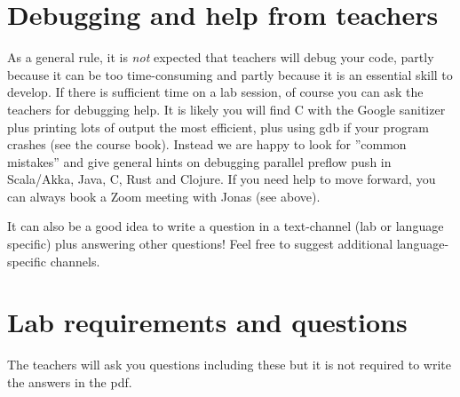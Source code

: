 \documentclass{forsete}
\begin{document}
\section{Debugging and help from teachers}
As a general rule, it is {\em not} expected that teachers will debug your code, partly because it can be 
too time-consuming and partly because it is an essential skill to develop. If there is sufficient time on a lab session, of course you can ask the teachers for debugging help. It is likely you will find C with the
Google sanitizer plus printing lots of output the most efficient, plus using gdb if your program crashes (see the
course book).
Instead we are happy to look for ''common mistakes'' and give general hints on debugging parallel preflow push in 
Scala/Akka, Java, C, Rust and Clojure. If you need help to move forward, you can always book a Zoom meeting with Jonas (see above).

It can also be a good idea to write a question in a text-channel (lab or language specific) plus answering 
other questions! Feel free to suggest additional language-specific channels.

\section{Lab requirements and questions}
The teachers will ask you questions including these but it is not required to write the answers in the pdf.
\end{document}
